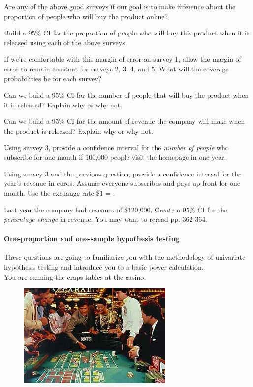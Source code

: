 \documentclass[12pt]{article}
\begin{document}
\benum
\easysubproblem Are any of the above good surveys if our goal is to make inference about the proportion of people who will buy the product online?

\easysubproblem Build a 95\% CI for the proportion of people who will buy this product when it is released using each of the above surveys.

\hardsubproblem If we're comfortable with this margin of error on survey 1, allow the margin of error to remain constant for surveys 2, 3, 4, and 5. What will the coverage probabilities be for each survey?

\easysubproblem Can we build a 95\% CI for the number of people that will buy the product when it is released? Explain why or why not.

\easysubproblem Can we build a 95\% CI for the amount of revenue the company will make when the product is released? Explain why or why not.

\easysubproblem Using survey 3, provide a confidence interval for the \textit{number of people} who subscribe for one month if 100,000 people visit the homepage in one year.

\easysubproblem Using survey 3 and the previous question, provide a confidence interval for the year's revenue in euros. Assume everyone subscribes and pays up front for one month. Use the exchange rate \$1 = .

\hardsubproblem Last year the company had revenues of \$120,000. Create a 95\% CI for the \textit{percentage change} in revenue. You may want to reread pp. 362-364.

\eenum

\paragraph{One-proportion and one-sample hypothesis testing} These questions are going to familiarize you with the methodology of univariate hypothesis testing and introduce you to a basic power calculation. \\

\problem You are running the craps tables at the casino.

\begin{figure}[htp]
\centering
\includegraphics[width=3in,height=2.00in]{craps.jpg}
\end{figure}
\FloatBarrier 
\end{document}
